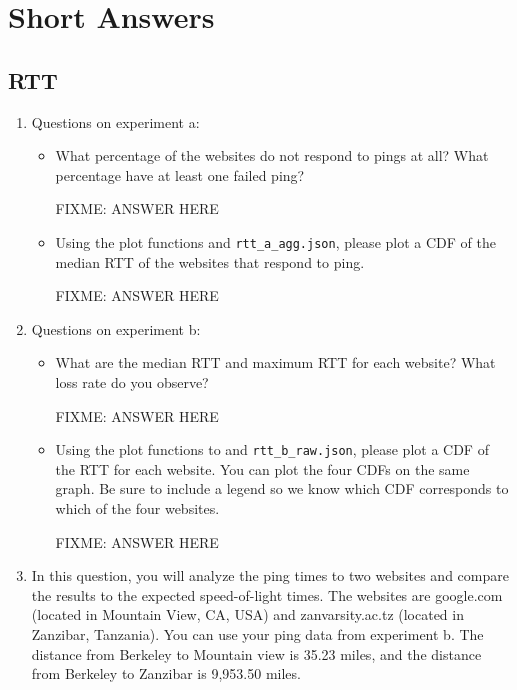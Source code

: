 \documentclass[10pt]{article}
\begin{document}
\section*{Short Answers}

\subsection*{RTT}

\begin{enumerate}
\item Questions on experiment a:

\begin{itemize}
\item What percentage of the websites do not respond to pings at all? What percentage have at least one failed ping?

FIXME: ANSWER HERE

\item Using the plot functions and \texttt{rtt\_a\_agg.json}, please plot a CDF of the median RTT of the websites that respond to ping.

FIXME: ANSWER HERE

\end{itemize}

\item Questions on experiment b:

\begin{itemize}

\item What are the median RTT and maximum RTT for each website? What loss rate do you observe?

FIXME: ANSWER HERE

\item Using the plot functions to and \texttt{rtt\_b\_raw.json}, please plot a CDF of the RTT for each website. You can plot the four CDFs on the same graph. Be sure to include a legend so we know which CDF corresponds to which of the four websites.

FIXME: ANSWER HERE

\end{itemize}

\item In this question, you will analyze the ping times to two websites and compare the results to the expected speed-of-light times. The websites are google.com (located in Mountain View, CA, USA) and zanvarsity.ac.tz (located in Zanzibar, Tanzania). You can use your ping data from experiment b. The distance from Berkeley to Mountain view is 35.23 miles, and the distance from Berkeley to Zanzibar is 9,953.50 miles.


\end{enumerate}
\end{document}
